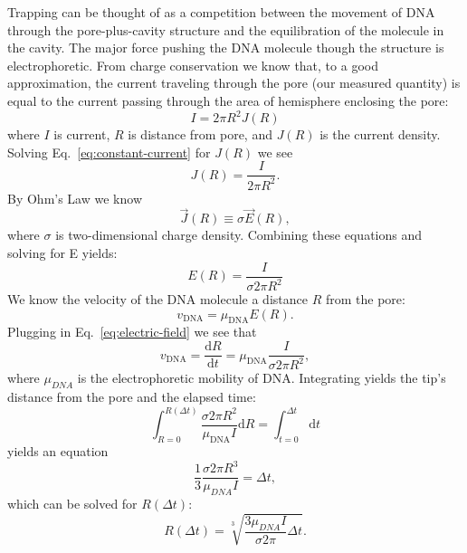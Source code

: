 \documentclass[aps,prl,preprint,groupedaddress]{revtex4}
\begin{document}
Trapping can be thought of as a competition between the movement of DNA through the pore-plus-cavity structure and the equilibration of the molecule in the cavity. The major force pushing the DNA molecule though the structure is electrophoretic. From charge conservation we know that, to a good approximation, the current traveling through the pore (our measured quantity) is equal to the current passing through the area of hemisphere enclosing the pore: 
\begin{equation} I = 2 \pi R^2 J(R) \label{eq:constant-current}\end{equation} 
where \(I\) is current, \(R\) is distance from pore, and \(J(R)\) is the current density. Solving Eq.~\ref{eq:constant-current} for \(J(R)\) we see 
\[J(R) = \frac{I}{2 \pi R^2}.\] 
By Ohm's Law we know 
\[\overrightarrow{J}(R) \equiv \sigma \overrightarrow{E}(R),\]
where \(\sigma\) is two-dimensional charge density.
Combining these equations and solving for E yields:
\begin{equation} E(R) = \frac{I}{\sigma 2 \pi R^2} \label{eq:electric-field} \end{equation} 
We know the velocity of the DNA molecule a distance \(R\) from the pore: 
\begin{equation} v_{\mathrm{DNA}} = \mu_{\mathrm{DNA}} E(R) \label{eq:velocity} .\end{equation} 
Plugging in Eq.~\ref{eq:electric-field} we see that
\[v_{\mathrm{DNA}} = \frac{\mathrm{d}R}{\mathrm{d}t} = \mu_{\mathrm{DNA}} \frac{I}{\sigma 2 \pi R^2},\]
where \(\mu_{DNA}\) is the electrophoretic mobility of DNA.
Integrating yields the tip's distance from the pore and the elapsed time:
\[\int_{R=0}^{R(\Delta t)} \frac{\sigma 2 \pi R^2}{\mu_{\mathrm{DNA}} I} \mathrm{d}R = \int_{t=0}^{\Delta t} \mathrm{d}t \]
yields an equation
\[\frac{1}{3} \frac{\sigma 2 \pi R^3}{\mu_{DNA} I} = \Delta t,\]
which can be solved for \(R(\Delta t)\):
\begin{equation} R(\Delta t) = \sqrt[3]{\frac{3 \mu_{DNA} I}{\sigma 2 \pi}\Delta t} .\label{eq:competition}\end{equation}
\end{document}
